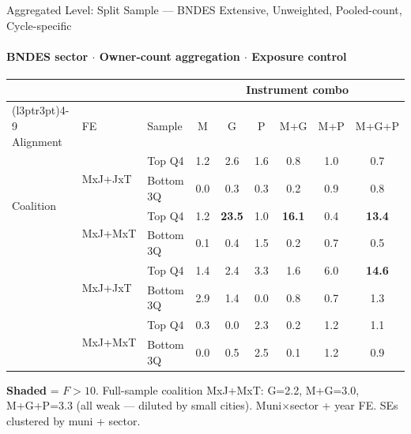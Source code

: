 \documentclass[aspectratio=169,10pt]{beamer}
\newcommand{\fpass}[1]{\cellcolor{pass}\textbf{#1}}
\begin{document}

\begin{frame}[t]{Aggregated Level: Split Sample --- BNDES Extensive, Unweighted, Pooled-count, Cycle-specific}
\framesubtitle{BNDES sector $\cdot$ Owner-count aggregation $\cdot$ Exposure control}
\begin{center}
\footnotesize
\setlength{\tabcolsep}{4pt}
\renewcommand{\arraystretch}{1.05}
\begin{tabular}{@{}lllcccccc@{}}
\toprule
 & & & \multicolumn{6}{c}{Instrument combo} \\
\cmidrule(l{3pt}r{3pt}){4-9}
Alignment & FE & Sample & M & G & P & M+G & M+P & M+G+P \\
\midrule
\multirow{4}{*}{Coalition}
 & \multirow{2}{*}{MxJ+JxT}
   & Top Q4    & 1.2 & 2.6           & 1.6 & 0.8           & 1.0 & 0.7           \\
 & & Bottom 3Q & 0.0 & 0.3           & 0.3 & 0.2           & 0.9 & 0.8           \\
 & \multirow{2}{*}{MxJ+MxT}
   & Top Q4    & 1.2 & \fpass{23.5}  & 1.0 & \fpass{16.1}  & 0.4 & \fpass{13.4}  \\
 & & Bottom 3Q & 0.1 & 0.4           & 1.5 & 0.2           & 0.7 & 0.5           \\
\addlinespace[4pt]
\multirow{4}{*}{Party}
 & \multirow{2}{*}{MxJ+JxT}
   & Top Q4    & 1.4 & 2.4           & 3.3 & 1.6           & 6.0 & \fpass{14.6}  \\
 & & Bottom 3Q & 2.9 & 1.4           & 0.0 & 0.8           & 0.7 & 1.3           \\
 & \multirow{2}{*}{MxJ+MxT}
   & Top Q4    & 0.3 & 0.0           & 2.3 & 0.2           & 1.2 & 1.1           \\
 & & Bottom 3Q & 0.0 & 0.5           & 2.5 & 0.1           & 1.2 & 0.9           \\
\bottomrule
\end{tabular}
\end{center}
{\scriptsize \colorbox{pass}{\textbf{Shaded}} = $F>10$.
Full-sample coalition MxJ+MxT: G=2.2, M+G=3.0, M+G+P=3.3 (all weak --- diluted by small cities).
Muni$\times$sector + year FE. SEs clustered by muni + sector.}
\end{frame}

\end{document}
